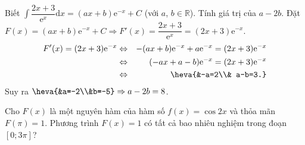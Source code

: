 \begin{ex}%
	Biết $\displaystyle\int   \dfrac{2x+3}{\mathrm{e}^x}\text{d}x= (ax+b)\mathrm{e}^{-x}+C$ (với $a$, $b\in \mathbb{R}$). Tính giá trị của $a-2b$.
	\loigiai
	{		
		Đặt $F(x)=(ax+b)\mathrm{e}^{-x}+C\Rightarrow F'(x)=\dfrac{2x+3}{\mathrm{e}^x}=(2x+3)\mathrm{e}^{-x}$.
		\begin{eqnarray*}
			F'(x)=(2x+3)\mathrm{e}^{-x} &\Leftrightarrow& -(ax+b)\mathrm{e}^{-x}+a  \mathrm{e}^{-x}=(2x+3)\mathrm{e}^{-x} \\
			&\Leftrightarrow&(-ax+a-b)\mathrm{e}^{-x}=(2x+3)\mathrm{e}^{-x}\\
			&\Leftrightarrow &\heva{&-a=2\\& a-b=3.}
		\end{eqnarray*}
		Suy ra $\heva{&a=-2\\&b=-5}\Rightarrow a-2b =8$.
	} 
\end{ex}
\begin{ex}%
	Cho $F(x)$ là một nguyên hàm của hàm số $f(x)=\cos 2x$ và thỏa mãn $F(\pi)=1$. Phương trình $F(x)=1$ có tất cả bao nhiêu nghiệm trong đoạn $[0 ; 3 \pi]$?
\end{ex}


